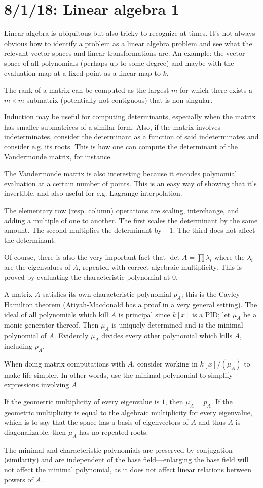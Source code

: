 \section{8/1/18: Linear algebra 1}
Linear algebra is ubiquitous but also tricky to recognize at times. It's not always obvious how to identify a problem as a linear algebra problem and see what the relevant vector spaces and linear transformations are. An example: the vector space of all polynomials (perhaps up to some degree) and maybe with the evaluation map at a fixed point as a linear map to $k$.

The rank of a matrix can be computed as the largest $m$ for which there exists a $m\times m$ submatrix (potentially not contiguous) that is non-singular.

Induction may be useful for computing determinants, especially when the matrix has smaller submatrices of a similar form. Also, if the matrix involves indeterminates, consider the determinant as a function of said indeterminates and consider e.g. its roots. This is how one can compute the determinant of the Vandermonde matrix, for instance.

The Vandermonde matrix is also interesting because it encodes polynomial evaluation at a certain number of points. This is an easy way of showing that it's invertible, and also useful for e.g. Lagrange interpolation.

The elementary row (resp. column) operations are scaling, interchange, and adding a multiple of one to another. The first scales the determinant by the same amount. The second multiplies the determinant by $-1$. The third does not affect the determinant.

Of course, there is also the very important fact that $\det A = \prod \lambda_i$ where the $\lambda_i$ are the eigenvalues of $A$, repeated with correct algebraic multiplicity. This is proved by evaluating the characteristic polynomial at 0.

A matrix $A$ satisfies its own characteristic polynomial $p_A$; this is the Cayley-Hamilton theorem (Atiyah-Macdonald has a proof in a very general setting). The ideal of all polynomials which kill $A$ is principal since $k[x]$ is a PID; let $\mu_A$ be a monic generator thereof. Then $\mu_A$ is uniquely determined and is the minimal polynomial of $A$. Evidently $\mu_A$ divides every other polynomial which kills $A$, including $p_A$.

When doing matrix computations with $A$, consider working in $k[x]/(\mu_A)$ to make life simpler. In other words, use the minimal polynomial to simplify expressions involving $A$.

If the geometric multiplicity of every eigenvalue is $1$, then $\mu_A = p_A$. If the geometric multiplicity is equal to the algebraic multiplicity for every eigenvalue, which is to say that the space has a basis of eigenvectors of $A$ and thus $A$ is diagonalizable, then $\mu_A$ has no repeated roots.

The minimal and characteristic polynomials are preserved by conjugation (similarity) and are independent of the base field---enlarging the base field will not affect the minimal polynomial, as it does not affect linear relations between powers of $A$.